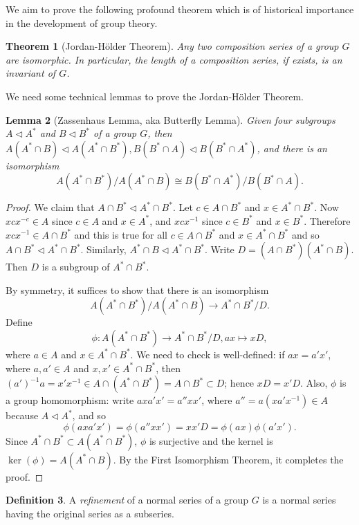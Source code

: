 \documentclass[12pt]{report}
\newtheorem{theorem}{Theorem}[section]
\newtheorem{lemma}[theorem]{Lemma}
\theoremstyle{definition}
\newtheorem{definition}[theorem]{Definition}
\begin{document}
We aim to prove the following profound theorem which is of historical importance in the development of group theory.

\begin{theorem}[Jordan-H\"{o}lder Theorem]\label{jhthm}
	Any two composition series of a group $G$ are isomorphic. In particular, the length of a composition series, if exists, is an invariant of $G$.
\end{theorem}

We need some technical lemmas to prove the Jordan-H\"{o}lder Theorem.

\begin{lemma}[Zassenhaus Lemma, aka Butterfly Lemma]
	Given four subgroups $A\triangleleft A^*$ and $B\triangleleft B^*$ of a group $G$, then $A(A^*\cap B)\triangleleft A(A^*\cap B^*), B(B^*\cap A)\triangleleft B(B^*\cap A^*)$, and there is an isomorphism
	\[A(A^*\cap B^*)/A(A^* \cap B) \cong B(B^*\cap A^*)/B(B^*\cap A).\]
\end{lemma}

\begin{proof}
	We claim that $A\cap B^* \triangleleft A^*\cap B^*$. Let $c\in A\cap B^*$ and $x\in A^*\cap B^*$. Now $xcx^{-c}\in A$ since $c\in A$ and $x\in A^*$, and $xcx^{-1}$ since $c\in B^*$ and $x\in B^{*}$. Therefore $xcx^{-1}\in A\cap B^*$ and this is true for all $c\in A\cap B^*$ and $x\in A^*\cap B^*$ and so $A\cap B^* \triangleleft A^*\cap B^*$. Similarly, $A^*\cap B\triangleleft A^*\cap B^*$. Write $D=(A\cap B^*)(A^*\cap B)$. Then $D$ is a subgroup of $A^*\cap B^*$.

	By symmetry, it suffices to show that there is an isomorphism
	$$ A(A^*\cap B^*)/A(A^* \cap B) \to A^*\cap B^*/D.$$
	Define
	$$\phi: A(A^*\cap B^*) \to A^*\cap B^*/D, ax\mapsto xD,$$ where $a\in A$ and $x\in A^*\cap B^*$. We need to check is well-defined: if $ax=a'x'$, where $a,a'\in A$ and $x,x'\in A^*\cap B^*$, then $(a')^{-1}a=x'x^{-1}\in A\cap (A^*\cap B^*)=A\cap B^*\subset D$; hence $xD=x'D$. Also, $\phi$ is a group homomorphism: write $a x a'x'=a''xx'$, where $a''=a(x a'x^{-1})\in A$ because $A\triangleleft A^*$, and so $$\phi(a x a'x')=\phi(a''xx')=x x'D=\phi(ax)\phi(a'x').$$ Since $A^*\cap B^*\subset A(A^*\cap B^*)$, $\phi$ is surjective and the kernel is $\ker(\phi)=A(A^*\cap B)$. By the First Isomorphism Theorem, it completes the proof.
\end{proof}

\begin{definition}
	A \emph{refinement} of a normal series of a group $G$ is a normal series having the original series as a subseries.
\end{definition}
\end{document}
